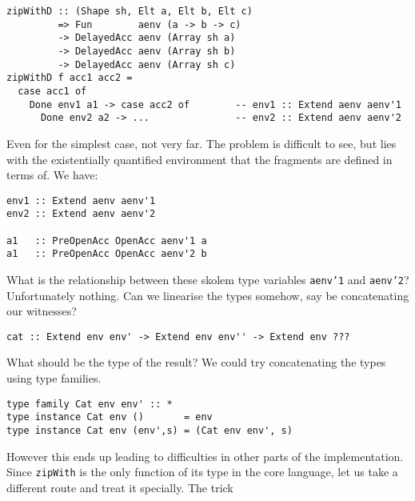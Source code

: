 %
%
%
\begin{lstlisting}[style=haskell]
zipWithD :: (Shape sh, Elt a, Elt b, Elt c)
         => Fun        aenv (a -> b -> c)
         -> DelayedAcc aenv (Array sh a)
         -> DelayedAcc aenv (Array sh b)
         -> DelayedAcc aenv (Array sh c)
zipWithD f acc1 acc2 =
  case acc1 of
    Done env1 a1 -> case acc2 of        -- env1 :: Extend aenv aenv'1
      Done env2 a2 -> ...               -- env2 :: Extend aenv aenv'2
\end{lstlisting}
%
Even for the simplest case, not very far. The problem is difficult to see, but
lies with the existentially quantified environment that the fragments are
defined in terms of. We have:
%
\begin{lstlisting}[style=haskell]
env1 :: Extend aenv aenv'1
env2 :: Extend aenv aenv'2

a1   :: PreOpenAcc OpenAcc aenv'1 a
a1   :: PreOpenAcc OpenAcc aenv'2 b
\end{lstlisting}
%
What is the relationship between these skolem type variables \texttt{aenv'1} and
\texttt{aenv'2}? Unfortunately nothing. Can we linearise the types somehow, say
be concatenating our witnesses?
%
\begin{lstlisting}[style=haskell]
cat :: Extend env env' -> Extend env env'' -> Extend env ???
\end{lstlisting}
%
What should be the type of the result? We could try concatenating the types
using type families.
%
\begin{lstlisting}[style=haskell]
type family Cat env env' :: *
type instance Cat env ()       = env
type instance Cat env (env',s) = (Cat env env', s)
\end{lstlisting}
%
However this ends up leading to difficulties in other parts of the
implementation. Since \texttt{zipWith} is the only function of its type in the
core language, let us take a different route and treat it specially. The trick
